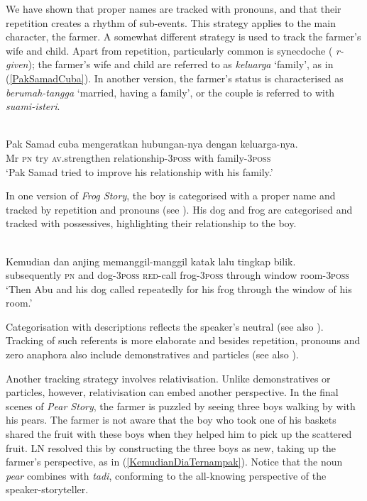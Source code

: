 \documentclass[output=paper
,modfonts
,nonflat]{langsci/langscibook}
\begin{document}
\noindent
We have shown that proper names are tracked with pronouns, and that their repetition creates a rhythm of sub-events. This strategy applies to the main character, the farmer. A somewhat different strategy is used to track the farmer's wife and child. Apart from repetition, particularly common is synecdoche ( \emph{r-given}); the farmer's wife and child are referred to as \emph{keluarga} `family', as in (\ref{PakSamadCuba}). In another version, the farmer's status is characterised as \emph{berumah-tangga} `married, having a family', or the couple is referred to with \emph{suami-isteri}.

\ea\label{PakSamadCuba} 
\\
\gll Pak Samad       cuba mengeratkan hubungan-nya         dengan  {\ob}keluarga-nya{\cb}.\\
Mr  \textsc{pn} try  \textsc{av.}strengthen  relationship-\textsc{3poss} with   family-\textsc{3poss}\\
\glt `Pak Samad tried to improve his relationship with his family.'
\z

\noindent
In one version of \emph{Frog Story}, the boy is categorised with a proper name and tracked by repetition and pronouns (see ). His dog and frog are categorised and tracked with possessives, highlighting their relationship to the boy.

\ea\label{KemudianAbuDan} 
\\
\gll 	Kemudian           dan   {\ob}anjing        memanggil-manggil  {\ob}katak        lalu tingkap  {\ob}bilik.\\
subsequently \textsc{pn} and  dog-\textsc{3poss}    \textsc{red-}call  frog-\textsc{3poss}    through window  room-\textsc{3poss}\\
\glt `Then Abu and his dog called repeatedly for his frog through the window of his room.'
\z

\noindent
Categorisation with descriptions reflects the speaker's neutral  (see also ). Tracking of such referents is more elaborate and besides repetition, pronouns and zero anaphora also include demonstratives and particles (see also ). 

Another tracking strategy involves relativisation. Unlike demonstratives or particles, however, relativisation can embed another perspective. In the final scenes of \emph{Pear Story}, the farmer is puzzled by seeing three boys walking by with his pears. The farmer is not aware that the boy who took one of his baskets shared the fruit with these boys when they helped him to pick up the scattered fruit. LN resolved this by constructing the three boys as new, taking up the farmer's perspective, as in (\ref{KemudianDiaTernampak}). Notice that the noun \emph{pear} combines with \emph{tadi}, conforming to the all-knowing perspective of the speaker-storyteller.
\end{document}
